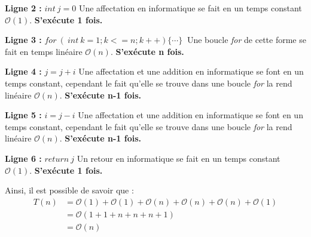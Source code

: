 \documentclass[12pt]{article}
\begin{document}
        \noindent \textbf{Ligne 2 :} \( int \: j = 0 \) \newline
        Une affectation en informatique se fait en un temps constant
        \( \mathcal{O}(1) \). \newline
		\textbf{S'exécute 1 fois.} \newline

        \noindent \textbf{Ligne 3 :}  \( for\: (\:int \: k=1;k<=n;k++) \{ \cdots \} \: \) \newline
        Une boucle \textit{for} de cette forme se fait en temps linéaire 
        \( \mathcal{O}(n) \). \newline
        \textbf{S'exécute n fois.} \newline
        
        \noindent \textbf{Ligne 4 :} \( j=j+i \) \newline
        Une affectation et une addition en informatique se font en un temps constant, \newline
        cependant le fait qu'elle se trouve dans une boucle \textit{for} la rend linéaire
        \( \mathcal{O}(n) \). \newline
		\textbf{S'exécute n-1 fois.} \newline

        \noindent \textbf{Ligne 5 :} \( i = j-i \) \newline
  	    Une affectation et une addition en informatique se font en un temps constant, \newline
        cependant le fait qu'elle se trouve dans une boucle \textit{for} la rend linéaire
        \( \mathcal{O}(n) \). \newline
		\textbf{S'exécute n-1 fois.} \newline    
    
        \noindent \textbf{Ligne 6 :} \( return \: j \) \newline
  	    Un retour en informatique se fait en un temps constant
        \( \mathcal{O}(1) \). \newline
        \textbf{S'exécute 1 fois.} \newline

        \noindent Ainsi, il est possible de savoir que : 
	    \begin{align*}
	       T(n) &= \mathcal{O}(1)+\mathcal{O}(1)+\mathcal{O}(n)+\mathcal{O}(n)+\mathcal{O}(n)+\mathcal{O}(1) \\
	   	   &= \mathcal{O}(1+1+n+n+n+1) \\
	       &= \mathcal{O}(n)
	    \end{align*}	    
      
\end{document}
